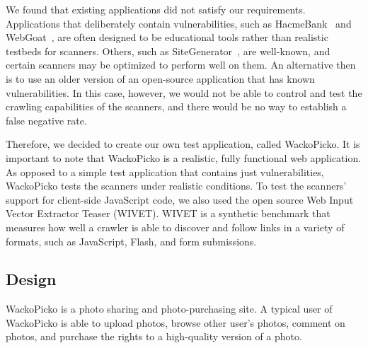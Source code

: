 We found that existing applications did not satisfy our requirements.
Applications that deliberately contain vulnerabilities, such as
HacmeBank~\cite{hacme_bank} and WebGoat~\cite{owasp-webgoat}, are often
designed to be educational tools rather than realistic testbeds for
scanners. Others, such as SiteGenerator~\cite{owasp_sitegenerator}, are
well-known, and certain scanners may be optimized to perform well on
them.
An alternative then is to use an older version of an open-source
application that has known vulnerabilities. In this case, however, we
would not be able to control and test the crawling capabilities of the
scanners, and there would be no way to establish a false negative
rate. 


Therefore, we decided to
create our own test application, called WackoPicko. It is important to
note that WackoPicko is a realistic, fully functional web application. As
opposed to a simple test application that contains just
vulnerabilities, WackoPicko tests the scanners under realistic conditions.
To test the scanners' support for client-side JavaScript code,
we also used the open source Web Input
Vector Extractor Teaser (WIVET). WIVET is a synthetic benchmark
that measures how well a crawler is able to discover and follow links
in a variety of formats, such as JavaScript, Flash, and form submissions.

\subsection{Design}
WackoPicko is a photo sharing and
photo-purchasing site. A typical
user of WackoPicko is able to upload photos, browse other user's
photos, comment on photos, and purchase the rights to a high-quality
version of a photo.

